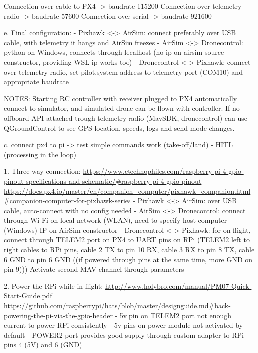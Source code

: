             Connection over cable to PX4 -> baudrate 115200
            Connection over telemetry radio -> baudrate 57600
            Connection over serial -> baudrate 921600
            
            e. Final configuration:
                - Pixhawk <-> AirSim:  connect preferably over USB cable, with telemetry it hangs and AirSim freezes
                - AirSim <-> Dronecontrol: python on Windows, connects through localhost (no ip on airsim source constructor, providing WSL ip works too)
                - Dronecontrol <-> Pixhawk: connect over telemetry radio, set pilot.system address to telemetry port (COM10) and appropriate baudrate
                
            NOTES: 
            Starting RC controller with receiver plugged to PX4 automatically connect to simulator, and simulated drone can be flown with controller.
            If no offboard API attached trough telemetry radio (MavSDK, dronecontrol) can use QGroundControl to see GPS location, speeds, logs and send mode changes.
        
    c. connect px4 to pi -> test simple commands work (take-off/land) - HITL (processing in the loop)
    
        1. Three way connection: \url{https://www.etechnophiles.com/raspberry-pi-4-gpio-pinout-specifications-and-schematic/#raspberry-pi-4-gpio-pinout} \url{https://docs.px4.io/master/en/companion_computer/pixhawk_companion.html#companion-computer-for-pixhawk-series}
            - Pixhawk <-> AirSim: over USB cable, auto-connect with no config needed
            - AirSim <-> Dronecontrol: connect through Wi-Fi on local network (WLAN), need to                                 specify host computer (Windows) IP on AirSim constructor
            - Dronecontrol <-> Pixhawk: for on flight, connect through TELEM2 port on PX4 to UART pins on RPi (TELEM2 left to right cables to RPi pins, cable 2 TX to pin 10 RX, cable 3 RX to pin 8 TX, cable 6 GND to pin 6 GND ((if powered through pins at the same time, more GND on pin 9))) Activate second MAV channel through parameters
            
        2. Power the RPi while in flight: \url{http://www.holybro.com/manual/PM07-Quick-Start-Guide.pdf} \url{https://github.com/raspberrypi/hats/blob/master/designguide.md#back-powering-the-pi-via-the-gpio-header}
            - 5v pin on TELEM2 port not enough current to power RPi consistently
            - 5v pins on power module not activated by default
            - POWER2 port provides good supply through custom adapter to RPi pins 4 (5V) and 6 (GND)
            
